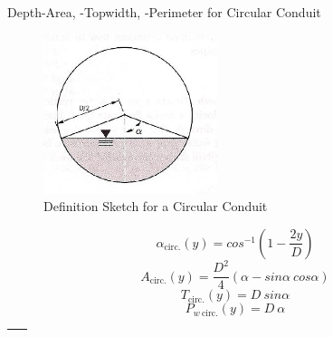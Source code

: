 \documentclass[11pt]{article}
\begin{document}
Depth-Area, -Topwidth, -Perimeter for Circular Conduit
\begin{figure}[h!] %
   \centering
   \includegraphics[width=2in]{CircularSewer.jpg} 
   \caption{Definition Sketch for a Circular Conduit}
   \label{fig:CircularSewer.jpg}
\end{figure}
\begin{equation}
\alpha_{\text{circ.}}(y) = cos^{-1}(1-\frac{2y}{D})
\end{equation}
\begin{equation}
A_{\text{circ.}}(y) = \frac{D^2}{4}(\alpha - sin\alpha~cos\alpha)
\end{equation}
\begin{equation}
T_{\text{circ.}}(y) = D~sin\alpha
\end{equation}
\begin{equation}
P_{w~\text{circ.}}(y) = D~\alpha
\end{equation}

\begin{tabular}{p{6in}}
~\\ \hline
\end{tabular}
\clearpage
\end{document}
